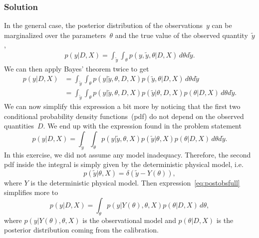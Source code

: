 \documentclass{article}
\begin{document}
\subsubsection*{Solution}

In the general case, the posterior distribution of the observations~$y$
can be marginalized over the parameters~$\theta$ and the true value
of the observed quantity~$\tilde{y}$, 
\begin{align*}
p(y|D,X)=\int_{\tilde{y}}\int_{\theta}p(y,\tilde{y},\theta|D,X)\, d\theta d\tilde{y}.
\end{align*}
 We can then apply Bayes' theorem twice to get 
\begin{align*}
p(y|D,X) & =\int_{\tilde{y}}\int_{\theta}p(y|\tilde{y},\theta,D,X)p(\tilde{y},\theta|D,X)\, d\theta d\tilde{y}\\
 & =\int_{\tilde{y}}\int_{\theta}p(y|\tilde{y},\theta,D,X)p(\tilde{y}|\theta,D,X)p(\theta|D,X)\, d\theta d\tilde{y}.
\end{align*}
 We can now simplify this expression a bit more by noticing that the
first two conditional probability density functions~(pdf) do not
depend on the observed quantities~$D$. We end up with the expression
found in the problem statement 
\begin{equation}
p(y|D,X)=\int_{\tilde{y}}\int_{\theta}p(y|\tilde{y},\theta,X)p(\tilde{y}|\theta,X)p(\theta|D,X)\, d\theta d\tilde{y}.\label{eq:postobsfull}
\end{equation}
 In this exercise, we did not assume any model inadequacy. Therefore,
the second pdf inside the integral is simply given by the deterministic
physical model, i.e. 
\[
p(\tilde{y}|\theta,X)=\delta(\tilde{y}-Y(\theta)),
\]
 where $Y$ is the deterministic physical model. Then expression~\ref{eq:postobsfull}
simplifies more to 
\begin{equation}
p(y|D,X)=\int_{\theta}p(y|Y(\theta),\theta,X)p(\theta|D,X)\, d\theta,\label{eq:postobs}
\end{equation}
 where $p(y|Y(\theta),\theta,X)$ is the observational model and $p(\theta|D,X)$
is the posterior distribution coming from the calibration.
\end{document}
